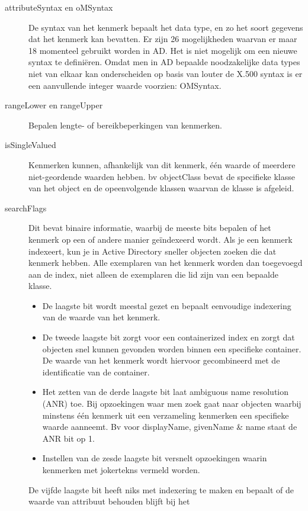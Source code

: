 \begin{description}
	\item[attributeSyntax en oMSyntax] De syntax van het kenmerk bepaalt het
		data type, en zo het soort gegevens dat het kenmerk kan
		bevatten. Er zijn 26 mogelijkheden waarvan er maar 18 momenteel
		gebruikt worden in AD. Het is niet mogelijk om een nieuwe syntax
		te definiëren. Omdat men in AD bepaalde noodzakelijke data types
		niet van elkaar kan onderscheiden op basis van louter de X.500
		syntax is er een aanvullende integer waarde voorzien: OMSyntax.
	\item[rangeLower en rangeUpper] Bepalen lengte- of bereikbeperkingen van
		kenmerken.
	\item[isSingleValued] Kenmerken kunnen, afhankelijk van dit kenmerk, één
		waarde of meerdere niet-geordende waarden hebben. bv objectClass
		bevat de specifieke klasse van het object en de opeenvolgende
		klassen waarvan de klasse is afgeleid.
	\item[searchFlags] Dit bevat binaire informatie, waarbij de meeste bits
		bepalen of het kenmerk op een of andere manier geïndexeerd
		wordt. Als je een kenmerk indexeert, kun je in Active Directory
		sneller objecten zoeken die dat kenmerk hebben. Alle exemplaren
		van het kenmerk worden dan toegevoegd aan de index, niet alleen
		de exemplaren die lid zijn van een bepaalde klasse.
		\begin{itemize}
			\item De laagste bit wordt meestal gezet en bepaalt
				eenvoudige indexering van de waarde van het
				kenmerk.
			\item De tweede laagste bit zorgt voor een containerized
				index en zorgt dat objecten snel kunnen gevonden
				worden binnen een specifieke container. De
				waarde van het kenmerk wordt hiervoor
				gecombineerd met de identificatie van de
				container.
			\item Het zetten van de derde laagste bit laat ambiguous
				name resolution (ANR) toe. Bij opzoekingen waar
				men zoek gaat naar objecten waarbij minstens één
				kenmerk uit een verzameling kenmerken een
				specifieke waarde aanneemt. Bv voor displayName,
				givenName \& name staat de ANR bit op 1.
			\item Instellen van de zesde laagste bit versnelt
				opzoekingen waarin kenmerken met jokertekns
				vermeld worden.
		\end{itemize}
		De vijfde laagste bit heeft niks met indexering te maken en
		bepaalt of de waarde van attribuut behouden blijft bij het

\end{description}
